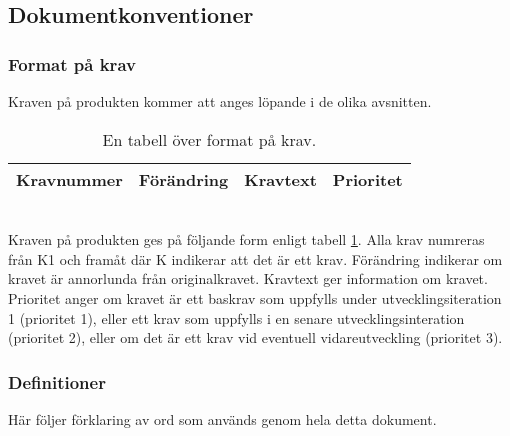 \subsection{Dokumentkonventioner}
\subsubsection{Format på krav}
Kraven på produkten kommer att anges löpande i de olika avsnitten.

\begin{table}[h!]
  \centering
  \caption{En tabell över format på krav.}
  \def\arraystretch{1.5}
  \begin{adjustbox}{max width=\textwidth}
    \begin{tabularx}{\textwidth}{ | c | l | X | c | }
      \hline
      Kravnummer & Förändring & Kravtext & Prioritet \\
      \hline
    \end{tabularx}
  \end{adjustbox}
  \label{tab:krav_format}
\end{table}
\ \\
Kraven på produkten ges på följande form enligt tabell \ref{tab:krav_format}. Alla krav numreras från K1 och framåt där K indikerar att det är ett krav. Förändring indikerar om kravet är annorlunda från originalkravet. Kravtext ger information om kravet. Prioritet anger om kravet är ett baskrav som uppfylls under utvecklingsiteration 1 (prioritet 1), eller ett krav som uppfylls i en senare utvecklingsinteration (prioritet 2), eller om det är ett krav vid eventuell vidareutveckling (prioritet 3).

\newpage
\subsubsection{Definitioner}
Här följer förklaring av ord som används genom hela detta dokument.

